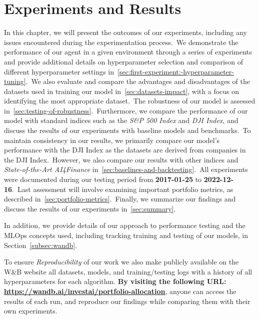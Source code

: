 \documentclass[../xlapes02]{subfiles}
\begin{document}
    \chapter{Experiments and Results}\label{ch:experiments-and-results}
    In this chapter, we will present the outcomes of our experiments, including any issues encountered during the experimentation process.\ We demonstrate the performance of our agent in a given environment through a series of experiments and provide additional details on hyperparameter selection and comparison of different hyperparameter settings in~\cref{sec:first-experiment:-hyperparameter-tuning}.\ We also evaluate and compare the advantages and disadvantages of the datasets used in training our model in~\ref{sec:datasets-impact}, with a focus on identifying the most appropriate dataset.\ The robustness of our model is assessed in~\ref{sec:testing-of-robustness}.\ Furthermore, we compare the performance of our model with standard indices such as the \emph{S\&P 500 Index} and \emph{DJI Index}, and discuss the results of our experiments with baseline models and benchmarks.\ To maintain consistency in our results, we primarily compare our model's performance with the DJI Index as the datasets are derived from companies in the DJI Index.\ However, we also compare our results with other indices and \emph{State-of-the-Art AI4Finance} in~\ref{sec:baselines-and-backtesting}.\ All experiments were documented during our testing period from \textbf{2017-01-25} to \textbf{2022-12-16}.\ Last assessment will involve examining important portfolio metrics, as described in~\cref{sec:portfolio-metrics}.\ Finally, we summarize our findings and discuss the results of our experiments in~\ref{sec:summary}.

    In addition, we provide details of our approach to performance testing and the MLOps concepts used, including tracking training and testing of our models, in Section~\ref{subsec:wandb}.

    To ensure \emph{Reproducibility} of our work we also make publicly available on the W\&B website all datasets, models, and training/testing logs with a history of all hyperparameters for each algorithm. \textbf{By visiting the following URL: \url{https://wandb.ai/investai/portfolio-allocation}}, anyone can access the results of each run, and reproduce our findings while comparing them with their own experiments.
\end{document}
